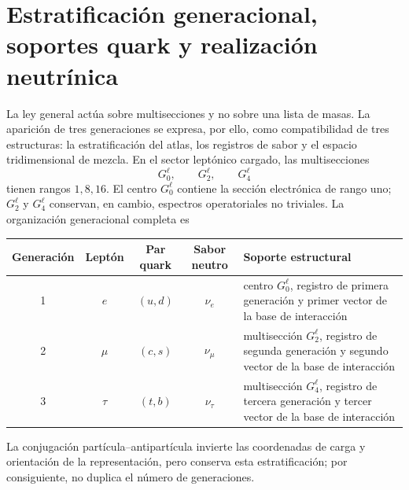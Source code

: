 \section{Estratificación generacional, soportes quark y realización neutrínica}
\label{sec:generaciones-quarks-neutrinos-rev2}

La ley general actúa sobre multisecciones y no sobre una lista de masas. La
aparición de tres generaciones se expresa, por ello, como compatibilidad de
tres estructuras: la estratificación del atlas, los registros de sabor y el
espacio tridimensional de mezcla. En el sector leptónico cargado, las
multisecciones
\begin{equation}
 G_0^{\ell},\qquad G_2^{\ell},\qquad G_4^{\ell}
 \label{eq:tres-multisecciones-leptonicas-rev2}
\end{equation}
tienen rangos \(1,8,16\). El centro \(G_0^\ell\) contiene la sección
electrónica de rango uno; \(G_2^\ell\) y \(G_4^\ell\) conservan, en cambio,
espectros operatoriales no triviales. La organización generacional completa
es
\begin{center}
\small
\begin{tabularx}{0.96\textwidth}{@{}c c c c X@{}}
\toprule
\textbf{Generación} & \textbf{Leptón} & \textbf{Par quark} &
\textbf{Sabor neutro} & \textbf{Soporte estructural}\\
\midrule
1 & \(e\) & \((u,d)\) & \(\nu_e\) & centro \(G_0^\ell\), registro de
primera generación y primer vector de la base de interacción\\
2 & \(\mu\) & \((c,s)\) & \(\nu_\mu\) & multisección \(G_2^\ell\),
registro de segunda generación y segundo vector de la base de interacción\\
3 & \(\tau\) & \((t,b)\) & \(\nu_\tau\) & multisección \(G_4^\ell\),
registro de tercera generación y tercer vector de la base de interacción\\
\bottomrule
\end{tabularx}
\end{center}
La conjugación partícula--antipartícula invierte las coordenadas de carga y
orientación de la representación, pero conserva esta estratificación; por
consiguiente, no duplica el número de generaciones.

